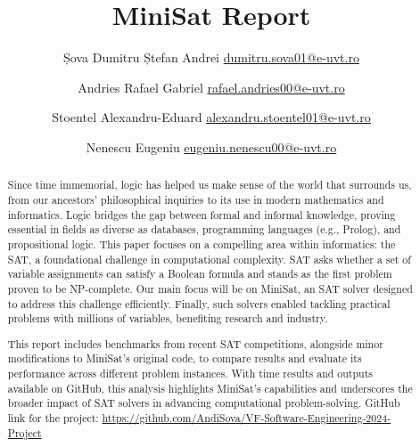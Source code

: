 \documentclass[runningheads]{llncs}
\begin{document}
%
\title{MiniSat Report}
%
%
\author{Șova Dumitru Ștefan Andrei \href{dumitru.sova01@e-uvt.ro}{dumitru.sova01@e-uvt.ro} \\
   \and Andries Rafael Gabriel \href{mailto:rafael.andries00@e-uvt.ro}{rafael.andries00@e-uvt.ro} \\
   \and Stoentel Alexandru-Eduard \href{mailto:alexandru.stoentel01@e-uvt.ro}{alexandru.stoentel01@e-uvt.ro} \\
   \and Nenescu Eugeniu \href{mailto:eugeniu.nenescu00@e-uvt.ro}{eugeniu.nenescu00@e-uvt.ro} }
%
%
%
\maketitle              %
%
\begin{abstract}

Since time immemorial, logic has helped us make sense of the world that surrounds us, from our ancestors' philosophical inquiries to its use in modern mathematics and informatics. Logic bridges the gap between formal and informal knowledge, proving essential in fields as diverse as databases, programming languages (\ac{e.g.}, Prolog), and propositional logic. This paper focuses on a compelling area within informatics: the \ac{SAT}, a foundational challenge in computational complexity. \ac{SAT} asks whether a set of variable assignments can satisfy a Boolean formula and stands as the first problem proven to be \ac{NP-complete}. Our main focus will be on MiniSat, an \ac{SAT} solver designed to address this challenge efficiently. Finally, such solvers enabled tackling practical problems with millions of variables, benefiting research and industry.

This report includes benchmarks from recent \ac{SAT} competitions, alongside minor modifications to MiniSat’s original code, to compare results and evaluate its performance across different problem instances. With time results and outputs available on GitHub, this analysis highlights MiniSat’s capabilities and underscores the broader impact of \ac{SAT} solvers in advancing computational problem-solving. GitHub link for the project: \url{https://github.com/AndiSova/VF-Software-Engineering-2024-Project}

\end{abstract}
\end{document}
